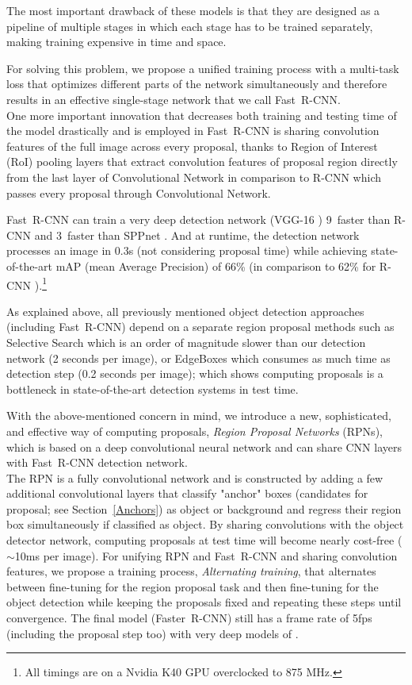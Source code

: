 \documentclass[conference]{IEEEtran}
\newcommand{\fast}[0]{\mbox{Fast~R-CNN}}
\newcommand{\faster}[0]{\mbox{Faster~R-CNN}}
\begin{document}
The most important drawback of these models is that they
are designed as a pipeline of multiple stages in which each stage has to be trained separately, making training expensive in time and space.

For solving this problem, we propose a unified training process with a multi-task loss that optimizes different parts of the network simultaneously and therefore results in an effective single-stage network that we call \fast{}.\\
One more important innovation that decreases both training and testing time of the model drastically and is employed in \fast{} is sharing convolution features of the full image across every proposal, 
thanks to Region of Interest (RoI) pooling layers that extract convolution features of proposal region directly from the last layer of Convolutional Network in comparison to R-CNN \cite{a9} which passes every proposal through Convolutional Network.

\fast{} can train a very deep detection network (VGG-16 \cite{a20}) 9\texttimes\ faster than R-CNN \cite{a9} and 3\texttimes\ faster than SPPnet \cite{a11}. And at runtime, the detection network processes an image in 0.3s (not considering proposal time) while achieving state-of-the-art mAP (mean Average Precision) of 66\% (in comparison to 62\% for R-CNN \cite{a9}).\footnote{All timings are on a Nvidia K40 GPU overclocked to 875 MHz.}

As explained above, all previously mentioned object detection approaches (including \fast{}) depend on a separate region proposal methods such as Selective Search \cite{b4} which is an order of magnitude slower than our detection network (2 seconds per image), or EdgeBoxes \cite{b6} which consumes as much time as detection step (0.2 seconds per image); which shows computing proposals is a bottleneck in state-of-the-art detection systems in test time.

With the above-mentioned concern in mind, we introduce a
new, sophisticated, and effective way of computing proposals, \textit{Region Proposal Networks} (RPNs), which is based on a deep convolutional neural network and can share CNN layers with \fast{} detection network.\\
The RPN is a fully convolutional network and
is constructed by adding a few additional convolutional
layers that classify "anchor" boxes (candidates for proposal;
see Section~\ref{Anchors})
as object or background and regress their region box simultaneously if
classified as object. By sharing convolutions with the object detector network, computing proposals at test time will become nearly cost-free ($\sim$10ms per image).
For unifying RPN and \fast{} and sharing convolution features, we propose a training process, \textit{Alternating training}, that alternates between fine-tuning for the region proposal task and then fine-tuning for the object detection while keeping the proposals fixed and repeating these steps until convergence. The final model (\faster{}) still has a frame rate of 5fps (including the proposal step too) with very deep models of \cite{a20}.
\end{document}
